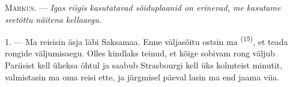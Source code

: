 %
%
%
%
%
%

\VUsaut{4.0mm}
\VUsaut{2.4mm}
\VUsaut{3.4mm}
\textsc{Märkus.} --- \textit{Igas riigis kasutatavad sõiduplaanid on erinevad, me
kasutame seetõttu näitena}  \textit{kellaaegu.}

1. --- Ma reisisin äsja läbi Saksamaa. Enne väljasõitu ostsin ma 
\textsuperscript{(15)}, et teada rongide väljumisaegu. Olles kindlaks teinud, et kõige
sobivam rong väljub Pariisist kell üheksa õhtul ja saabub Strasbourgi kell üks
kolmteist minutit, valmistasin ma oma reisi ette, ja järgmisel päeval lasin ma end
jaama viia.

